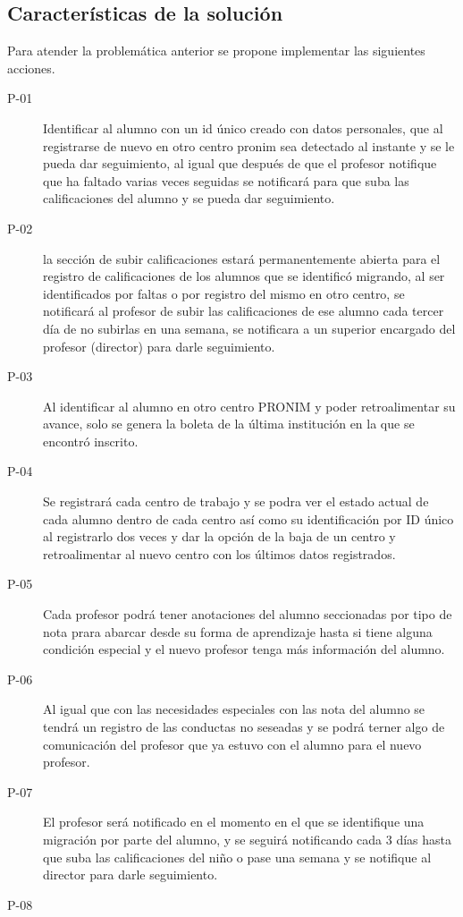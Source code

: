 \subsection{Características de la solución}

\cdtInstrucciones{
}

Para atender la problemática anterior se propone implementar las siguientes acciones.

\begin{description}
	\item[P-01]	Identificar al alumno con un id único creado con datos personales, que al registrarse de nuevo en otro centro pronim sea detectado al instante y se le pueda dar seguimiento, al igual que después de que el profesor notifique que ha faltado varias veces seguidas se notificará para que suba las calificaciones del alumno y se pueda dar seguimiento.
	\item[P-02] la sección de subir calificaciones estará permanentemente abierta para el registro de calificaciones de los alumnos que se identificó migrando, al ser identificados por faltas o por registro del mismo en otro centro, se notificará al profesor de subir las calificaciones de ese alumno cada tercer día de no subirlas en una semana, se notificara a un superior encargado del profesor (director) para darle seguimiento.
         \item[P-03] Al identificar al alumno en otro centro PRONIM y poder retroalimentar su avance, solo se genera la boleta de la última institución en la que se encontró inscrito.


         \item[P-04]Se registrará cada centro de trabajo y se podra ver el estado actual de cada alumno dentro de cada centro así como su identificación por ID único al registrarlo dos veces y dar la opción de la baja de un centro y retroalimentar al nuevo centro con los últimos datos registrados.
         \item[P-05] Cada profesor podrá tener anotaciones del alumno seccionadas por tipo de nota prara abarcar desde su forma de aprendizaje hasta si tiene alguna condición especial y el nuevo profesor tenga más información del alumno.

         \item[P-06] Al igual que con las necesidades especiales con las nota del alumno se tendrá un registro de las conductas no seseadas y se podrá terner algo de comunicación del profesor que ya estuvo con el alumno para el nuevo profesor.

         \item[P-07]  El profesor será notificado en el momento en el que se identifique una migración por parte del alumno, y se seguirá notificando cada 3 días hasta que suba las calificaciones del niño o pase una semana y se notifique al director para darle seguimiento. 

         \item[P-08]
\end{description}

